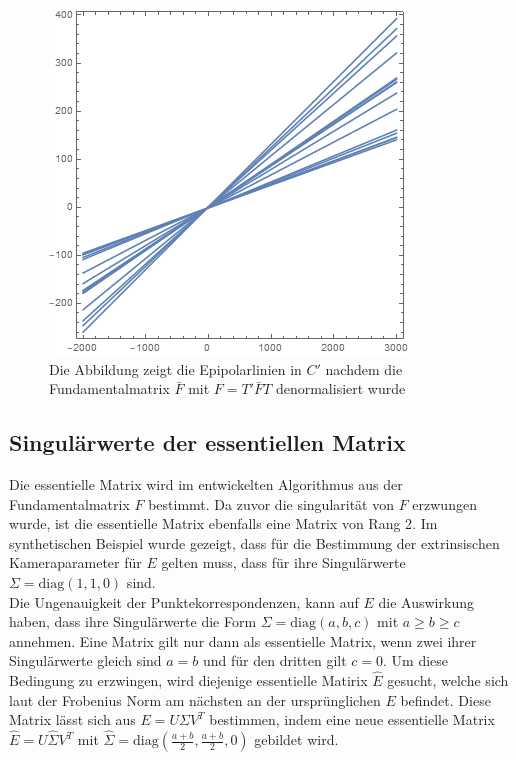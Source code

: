 \begin{figure}[!htb]
	\includegraphics[width=\linewidth]{images/LPrime_PC2_F_Constraint_denormalized.png}
	\caption[Epipolarlinien in $C$ aus singulärer denormalisierter Fundamentalmatrix]{Die Abbildung zeigt die Epipolarlinien in $C'$ nachdem die Fundamentalmatrix $\bar{F}$ mit $F = T'\bar{F}T$ denormalisiert wurde}
	\label{fig:EpipoleWithF2Denorm}
	\endminipage\hfill
\end{figure}

\pagebreak

\subsection{Singulärwerte der essentiellen Matrix}

Die essentielle Matrix wird im entwickelten Algorithmus aus der Fundamentalmatrix $F$ bestimmt. Da zuvor die singularität von $F$ erzwungen wurde, ist die essentielle Matrix ebenfalls eine Matrix von Rang 2\cite{HZ}. Im synthetischen Beispiel wurde gezeigt, dass für die Bestimmung der extrinsischen Kameraparameter für $E$ gelten muss, dass für ihre Singulärwerte $\Sigma = \text{diag}(1,1,0)$ sind. \\

Die Ungenauigkeit der Punktekorrespondenzen, kann auf $E$ die Auswirkung haben, dass ihre Singulärwerte die Form $\Sigma = \text{diag}(a,b,c)$ mit $a \geq b \geq c$ annehmen. Eine Matrix gilt nur dann als essentielle Matrix, wenn zwei ihrer Singulärwerte gleich sind $a = b$ und für den dritten gilt $c=0$. Um diese Bedingung zu erzwingen, wird diejenige essentielle Matirix $\hat{E}$ gesucht, welche sich laut der Frobenius Norm am nächsten an der ursprünglichen $E$ befindet\cite{HZ,Ferid}. Diese Matrix lässt sich aus $E = U \Sigma V^T$ bestimmen, indem eine neue essentielle Matrix $\hat{E} = U \hat{\Sigma}V^T$ mit $\hat{\Sigma} = \text{diag}(\frac{a+b}{2},\frac{a+b}{2},0)$\cite{HZ} gebildet wird.\\

